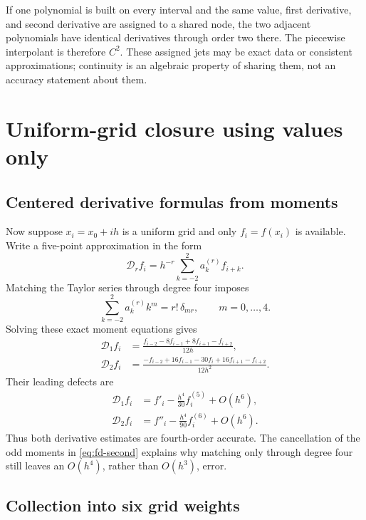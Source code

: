 \documentclass[11pt]{article}
\newcommand{\D}{\mathcal{D}}
\begin{document}
If one polynomial is built on every interval and the same value, first
derivative, and second derivative are assigned to a shared node, the two
adjacent polynomials have identical derivatives through order two there.
The piecewise interpolant is therefore $C^2$.  These assigned jets may be
exact data or consistent approximations; continuity is an algebraic property
of sharing them, not an accuracy statement about them.

\section{Uniform-grid closure using values only}
\label{sec:value-only-1d}

\subsection{Centered derivative formulas from moments}

Now suppose $x_i=x_0+ih$ is a uniform grid and only $f_i=f(x_i)$ is
available.  Write a five-point approximation in the form
\[
  \D_r f_i=h^{-r}\sum_{k=-2}^{2}a_k^{(r)}f_{i+k}.
\]
Matching the Taylor series through degree four imposes
\begin{equation}
  \sum_{k=-2}^{2}a_k^{(r)}k^m=r!\,\delta_{mr},
  \qquad m=0,\ldots,4.
  \label{eq:fd-moments}
\end{equation}
Solving these exact moment equations gives
\begin{align}
  \D_1 f_i
  &=\frac{f_{i-2}-8f_{i-1}+8f_{i+1}-f_{i+2}}{12h},
  \label{eq:fd-first}\\
  \D_2 f_i
  &=\frac{-f_{i-2}+16f_{i-1}-30f_i+16f_{i+1}-f_{i+2}}{12h^2}.
  \label{eq:fd-second}
\end{align}
Their leading defects are
\begin{align}
  \D_1 f_i&=f'_i-\frac{h^4}{30}f_i^{(5)}+O(h^6),
  \label{eq:fd-first-error}\\
  \D_2 f_i&=f''_i-\frac{h^4}{90}f_i^{(6)}+O(h^6).
  \label{eq:fd-second-error}
\end{align}
Thus both derivative estimates are fourth-order accurate.  The cancellation
of the odd moments in \eqref{eq:fd-second} explains why matching only through
degree four still leaves an $O(h^4)$, rather than $O(h^3)$, error.

\subsection{Collection into six grid weights}
\end{document}
